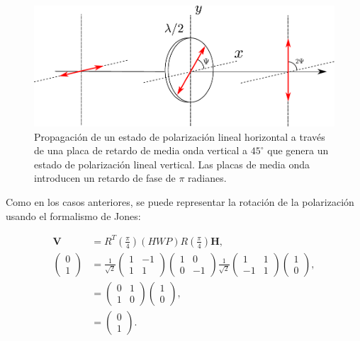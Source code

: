 \begin{figure}[h!]
\centering
\includegraphics[scale=.7]{HWP_retarder}
\caption[Generación de estados de polarización lineales]{Propagación de un estado de polarización lineal horizontal a través de una placa de retardo de media onda
  vertical a $45^{\circ}$ que genera un estado de polarización lineal vertical. Las
placas de media onda introducen un retardo de fase de
$\pi$ radianes.}
\label{fig:hwp_retarder}
\end{figure}

Como en los casos anteriores, se puede representar la rotación de la
polarización usando el formalismo de Jones:

\begin{align*}
\mathbf{V} &=
R^{T}\left(\frac{\pi}{4}\right)\left(HWP\right)R\left(\frac{\pi}{4}\right)\mathbf{H},\\ 
\begin{pmatrix}
0\\1
\end{pmatrix}&=
 \frac{1}{\sqrt{2}}
\begin{pmatrix}
  1 &-1\\1&1
\end{pmatrix}
\begin{pmatrix} 1
  &0\\0&-1 \end{pmatrix}
 \frac{1}{\sqrt{2}}
\begin{pmatrix}
1&1\\-1&1
\end{pmatrix}
\begin{pmatrix}
1\\ 0
\end{pmatrix},
\\
&=
\begin{pmatrix}
0  & 1 \\1 & 0
\end{pmatrix}
\begin{pmatrix}
1\\ 0
\end{pmatrix},\\&=
\begin{pmatrix}
0\\1
\end{pmatrix}.
\end{align*}


